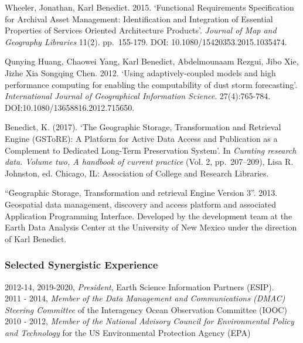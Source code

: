 \documentclass[]{article}
\begin{document}
Wheeler, Jonathan, Karl Benedict. 2015. `Functional Requirements
Specification for Archival Asset Management: Identification and
Integration of Essential Properties of Services Oriented Architecture
Products'. \emph{Journal of Map and Geography Libraries} 11(2).
pp.~155-179. DOI: 10.1080/15420353.2015.1035474.

Qunying Huang, Chaowei Yang, Karl Benedict, Abdelmounaam Rezgui, Jibo
Xie, Jizhe Xia Songqing Chen. 2012. `Using adaptively-coupled models and
high performance computing for enabling the computability of dust storm
forecasting'. \emph{International Journal of Geographical Information
Science}. 27(4):765-784. DOI:10.1080/13658816.2012.715650.

Benedict, K. (2017). `The Geographic Storage, Transformation and
Retrieval Engine (GSToRE): A Platform for Active Data Access and
Publication as a Complement to Dedicated Long-Term Preservation System'.
In \emph{Curating research data. Volume two, A handbook of current
practice} (Vol. 2, pp.~207--209), Lisa R. Johnston, ed. Chicago, IL:
Association of College and Research Libraries.

``Geographic Storage, Transformation and retrieval Engine Version 3''.
2013. Geospatial data management, discovery and access platform and
associated Application Programming Interface. Developed by the
development team at the Earth Data Analysis Center at the University of
New Mexico under the direction of Karl Benedict.

\hypertarget{selected-synergistic-experience}{%
\subsubsection{Selected Synergistic
Experience}\label{selected-synergistic-experience}}

2012-14, 2019-2020, \emph{President}, Earth Science Information Partners
(ESIP).\\
2011 - 2014, \emph{Member of the Data Management and Communications
(DMAC) Steering Committee} of the Interagency Ocean Observation
Committee (IOOC)\\
2010 - 2012, \emph{Member of the National Advisory Council for
Environmental Policy and Technology} for the US Environmental Protection
Agency (EPA)
\end{document}
